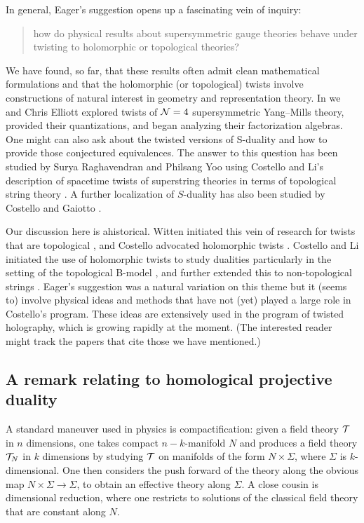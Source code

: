 \documentclass[11pt]{amsart}
\begin{document}
In general, Eager's suggestion opens up a fascinating vein of inquiry:
\begin{quote}
how do physical results about supersymmetric gauge theories behave under twisting to holomorphic or topological theories?
\end{quote}
We have found, so far, that these results often admit clean mathematical formulations and that the holomorphic (or topological) twists involve constructions of natural interest in geometry and representation theory.
In \cite{EGW} we and Chris Elliott explored twists of $\mathcal N=4$ supersymmetric Yang--Mills theory,
provided their quantizations, and began analyzing their factorization algebras.
One might can also ask about the twisted versions of S-duality and how to provide those conjectured equivalences.
The answer to this question has been studied by Surya Raghavendran and Philsang Yoo \cite{RYsduality} using Costello and Li's description of spacetime twists of superstring theories in terms of topological string theory \cite{CLsugra,CLtypeI}. 
A further localization of $S$-duality has also been studied by Costello and Gaiotto \cite{CGholography}.

\begin{rmk}
Our discussion here is ahistorical.
Witten initiated this vein of research for twists that are topological \cite{WittenTwist},
and Costello advocated holomorphic twists \cite{CostelloHol}.  
Costello and Li initiated the use of holomorphic twists to study dualities particularly in the setting of the topological B-model \cite{CLbcov1,CLbcov2,CLbcov3}, and further extended this to non-topological strings \cite{CLsugra}. 
Eager's suggestion was a natural variation on this theme but it (seems to) involve physical ideas and methods that have not (yet) played a large role in Costello's program.
These ideas are extensively used in the program of twisted holography, which is growing rapidly at the moment.
(The interested reader might track the papers that cite those we have mentioned.)
\end{rmk}

\subsection{A remark relating to homological projective duality}

A standard maneuver used in physics is compactification:
given a field theory $\mathcal T$ in $n$ dimensions, one takes compact $n-k$-manifold $N$ and produces a field theory $\mathcal T_N$ in $k$ dimensions by studying $\mathcal T$ on manifolds of the form $N \times \Sigma$, where $\Sigma$ is $k$-dimensional.
One then considers the push forward of the theory along the obvious map $N \times \Sigma \to \Sigma$, to obtain an effective theory along $\Sigma$.
A close cousin is dimensional reduction, where one restricts to solutions of the classical field theory that are constant along $N$.
\end{document}
